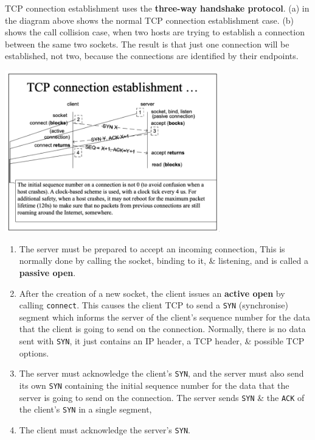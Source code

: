\documentclass[11pt]{article}
\begin{document}
TCP connection establishment uses the \textbf{three-way handshake protocol}. 
(a) in the diagram above shows the normal TCP connection establishment case. 
(b) shows the call collision case, when two hosts are trying to establish a connection between the same two 
sockets. 
The result is that just one connection will be established, not two, because the connections are identified 
by their endpoints.

\begin{center}
    \includegraphics[width=0.7\textwidth]{tcpconnectionestablishment1.png}
\end{center}
\begin{enumerate}
    \item   The server must be prepared to accept an incoming connection, 
            This is normally done by calling the socket, binding to it, \& listening, and is called a \textbf{passive open}. 
    \item   After the creation of a new socket, the client issues an \textbf{active open} by calling \verb|connect|. 
            This causes the client TCP to send a \verb|SYN| (synchronise) segment which informs the server of 
            the client's sequence number for the data that the client is going to send on the connection.
            Normally, there is no data sent with \verb|SYN|, it just contains an IP header, a TCP header, \& 
            possible TCP options.
    \item   The server must acknowledge the client's \verb|SYN|, and the server must also send its own \verb|SYN| 
            containing the initial sequence number for the data that the server is going to send on the connection. 
            The server sends \verb|SYN| \& the \verb|ACK| of the client's \verb|SYN| in a single segment, 
    \item   The client must acknowledge the server's \verb|SYN|.
\end{enumerate}
\end{document}
